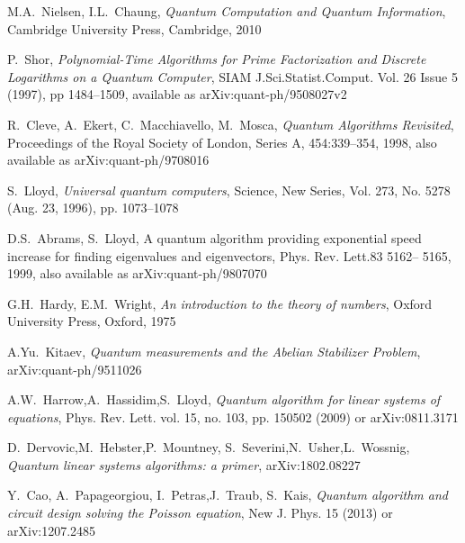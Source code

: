 \documentclass[a4paper, draft]{article}
\theoremstyle{own}
\theoremstyle{remark}
\begin{document}

\begin{thebibliography}{9}


M.A.~Nielsen, I.L.~Chaung, \emph{Quantum Computation and Quantum Information},
Cambridge University Press, Cambridge, 2010

P.~Shor, \emph{Polynomial-Time Algorithms for Prime Factorization and Discrete Logarithms on a Quantum Computer}, SIAM J.Sci.Statist.Comput. Vol. 26 Issue 5 (1997), pp 1484--1509, available as arXiv:quant-ph/9508027v2


R.~Cleve, A.~Ekert, C.~Macchiavello, M.~Mosca, \emph{Quantum Algorithms Revisited}, 	Proceedings of the Royal Society of London, Series A, 454:339–354, 1998, also available as arXiv:quant-ph/9708016

S.~Lloyd, \emph{Universal quantum computers},
Science, New Series, Vol. 273, No. 5278 (Aug. 23, 1996), pp. 1073--1078

D.S.~Abrams, S.~Lloyd, A quantum algorithm providing exponential speed increase for finding eigenvalues and eigenvectors, Phys. Rev. Lett.83 5162-- 5165, 1999, also available as arXiv:quant-ph/9807070

G.H.~Hardy, E.M.~Wright, \emph{An introduction to the theory of numbers}, Oxford University Press, Oxford, 1975

A.Yu.~Kitaev, \emph{Quantum measurements and the Abelian Stabilizer Problem}, arXiv:quant-ph/9511026
	
A.W.~Harrow,A.~Hassidim,S.~Lloyd, \emph{Quantum algorithm for linear systems of equations}, Phys. Rev. Lett. vol. 15, no. 103, pp. 150502 (2009) or arXiv:0811.3171 

D.~Dervovic,M.~Hebster,P.~Mountney, S.~Severini,N.~Usher,L.~Wossnig, \emph{Quantum linear systems algorithms: a primer}, arXiv:1802.08227

Y.~Cao, A.~Papageorgiou, I.~Petras,J.~Traub, S.~Kais,
\emph{Quantum algorithm and circuit design solving the Poisson equation}, New J. Phys. 15 (2013) or arXiv:1207.2485 

\end{thebibliography}
\end{document}
